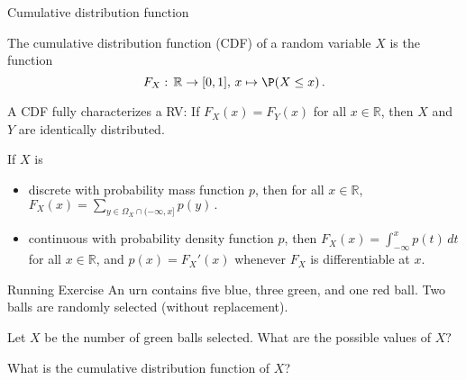 \documentclass[11pt,compress,t,notes=noshow, xcolor=table]{beamer}
\begin{document}
\begin{vbframe}{Cumulative distribution function}
 
 The cumulative distribution function (CDF) of a random variable $X$ is the function
		$$
		F_X:\, \mathbb{R} \to [0,1], \, x \mapsto \P(X \leq x) \, .
		$$
		
A CDF fully characterizes a RV: If $F_X(x) = F_Y(x)$ for all $x \in \mathbb{R}$, then $X$ and $Y$ are identically distributed.
		
		\lz
		

If $X$ is 
\begin{itemize}
%	
	\item discrete with probability mass function $p$, then for all $x \in \mathbb{R}$, 
	$
	F_X(x) = \sum_{y \in \Omega_X \cap (-\infty, x]} p(y) \, .
	$
%	
	\item continuous with probability density function $p$, then 
	$
	F_X(x)  = \int_{-\infty}^x p(t) \, dt 
	$
	for all $x \in \mathbb{R}$, and $p(x) = F_X'(x)$ whenever $F_X$ is differentiable at $x$. 
%	
\end{itemize}

\end{vbframe}


\begin{vbframe}{Running Exercise}  
	An urn contains five blue, three green, and one red ball. Two balls are randomly selected (without replacement).
	
	\lz
	
	
	
	Let $X$ be the number of green balls selected. What are the possible values of $X?$
	
	
	\lz
	
	\lz
	\lz
	\lz
	
	What is the cumulative distribution function of $X$?
	
	
	
\end{vbframe}
\end{document}
